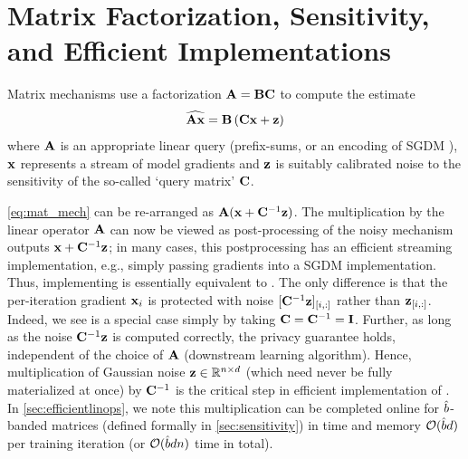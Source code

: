 \documentclass{article}
\begin{document}

\section{Matrix Factorization, Sensitivity, and Efficient Implementations}\label{sec:setup}

Matrix mechanisms use a factorization $\mathbf{A} = \mathbf{B}\mathbf{C}$ to compute the estimate
\begin{equation}\label{eq:mat_mech}
\widehat{\mathbf{A}\mathbf{x}} = \mathbf{B}\left(\mathbf{C}\mathbf{x} + \mathbf{z}\right)
\end{equation}
where $\mathbf{A}$ is an appropriate linear query (prefix-sums, or an encoding of SGDM \citep{denisov22matfact}), $\mathbf{x}$ represents a stream of model gradients and $\mathbf{z}$ is suitably calibrated noise to the sensitivity of the so-called `query matrix' $\mathbf{C}$.

\cref{eq:mat_mech} can be re-arranged as $\mathbf{A}(\mathbf{x} + \mathbf{C}^{-1} \mathbf{z})$. The multiplication by the linear operator $\mathbf{A}$ can now be viewed as post-processing of the noisy mechanism outputs $\mathbf{x} + \mathbf{C}^{-1} \mathbf{z}$; in many cases, this postprocessing has an efficient streaming implementation, e.g., simply passing gradients into a SGDM implementation. Thus, implementing \MFFTRL is essentially equivalent to \DPSGD. The only difference is that the per-iteration gradient $\mathbf{x}_i$ is protected with noise $[\mathbf{C}^{-1} \mathbf{z}]_{[i, :]}$ rather than $\mathbf{z}_{[i, :]}$. Indeed, we see \DPSGD is a special case simply by taking $\mathbf{C} = \mathbf{C}^{-1} = \mathbf{I}$. Further, as long as the noise $\mathbf{C}^{-1} \mathbf{z}$ is computed correctly, the privacy guarantee holds, independent of the choice of $\mathbf{A}$ (downstream learning algorithm). 
%
Hence, multiplication of Gaussian noise $\mathbf{z} \in \mathbb{R}^{n \times d}$ (which need never be fully materialized at once) by $\mathbf{C}^{-1}$ is the critical step in efficient implementation of \MF. In \cref{sec:efficientlinops}, we note this multiplication can be completed online for $\hat{b}$-banded matrices (defined formally in \cref{sec:sensitivity}) in time and memory $\mathcal{O}(\hat{b} d)$ per training iteration (or $\mathcal{O}(\hat{b} d n)$ time in total).
\end{document}
